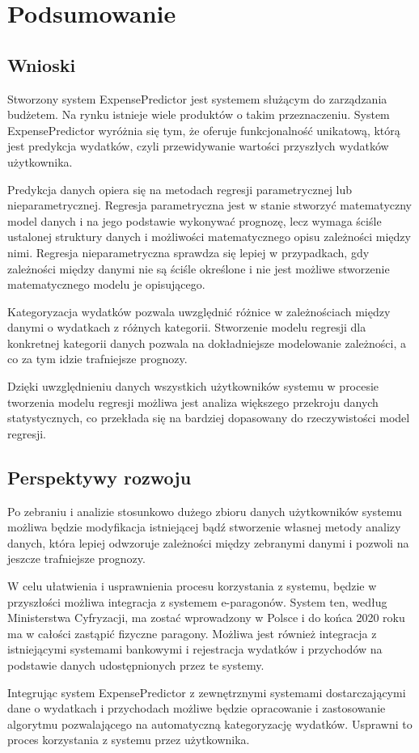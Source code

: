 \chapter{Podsumowanie}
\section{Wnioski}
Stworzony system ExpensePredictor jest systemem służącym do zarządzania budżetem. Na rynku istnieje wiele produktów o takim przeznaczeniu. System ExpensePredictor wyróżnia się tym, że oferuje funkcjonalność unikatową, którą jest predykcja wydatków, czyli przewidywanie wartości przyszłych wydatków użytkownika.

Predykcja danych opiera się na metodach regresji parametrycznej lub nieparametrycznej. Regresja parametryczna jest w stanie stworzyć matematyczny model danych i na jego podstawie wykonywać prognozę, lecz wymaga ściśle ustalonej struktury danych i możliwości matematycznego opisu zależności między nimi. Regresja nieparametryczna sprawdza się lepiej w przypadkach, gdy zależności między danymi nie są ściśle określone i nie jest możliwe stworzenie matematycznego modelu je opisującego.

Kategoryzacja wydatków pozwala uwzględnić różnice w zależnościach między danymi o wydatkach z różnych kategorii. Stworzenie modelu regresji dla konkretnej kategorii danych pozwala na dokładniejsze modelowanie zależności, a co za tym idzie trafniejsze prognozy.

Dzięki uwzględnieniu danych wszystkich użytkowników systemu w procesie tworzenia modelu regresji możliwa jest analiza większego przekroju danych statystycznych, co przekłada się na bardziej dopasowany do rzeczywistości model regresji.
\section{Perspektywy rozwoju}
Po zebraniu i analizie stosunkowo dużego zbioru danych użytkowników systemu możliwa będzie modyfikacja istniejącej bądź stworzenie własnej metody analizy danych, która lepiej odwzoruje zależności między zebranymi danymi i pozwoli na jeszcze trafniejsze prognozy.

W celu ułatwienia i usprawnienia procesu korzystania z systemu, będzie w przyszłości możliwa integracja z systemem e-paragonów. System ten, według Ministerstwa Cyfryzacji, ma zostać wprowadzony w Polsce i do końca 2020 roku ma w całości zastąpić fizyczne paragony.\cite{eparagon} Możliwa jest również integracja z istniejącymi systemami bankowymi i rejestracja wydatków i przychodów na podstawie danych udostępnionych przez te systemy.

Integrując system ExpensePredictor z zewnętrznymi systemami dostarczającymi dane o wydatkach i przychodach możliwe będzie opracowanie i zastosowanie algorytmu pozwalającego na automatyczną kategoryzację wydatków. Usprawni to proces korzystania z systemu przez użytkownika.

